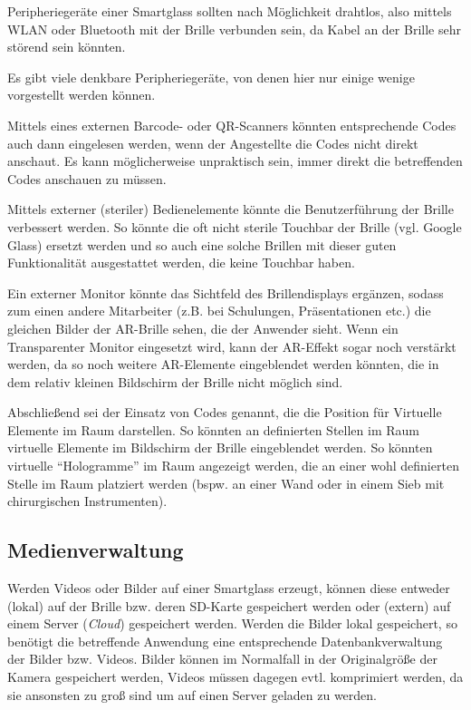 Peripheriegeräte einer Smartglass sollten nach Möglichkeit drahtlos, also mittels WLAN oder Bluetooth mit der Brille verbunden sein, da Kabel an der Brille sehr störend sein könnten. 

Es gibt viele denkbare Peripheriegeräte, von denen hier nur einige wenige vorgestellt werden können.

Mittels eines externen Barcode- oder QR-Scanners könnten entsprechende Codes auch dann eingelesen werden, wenn der Angestellte die Codes nicht direkt anschaut. Es kann möglicherweise unpraktisch sein, immer direkt die betreffenden Codes anschauen zu müssen. 

Mittels externer (steriler) Bedienelemente könnte die Benutzerführung der Brille verbessert werden. So könnte die oft nicht sterile Touchbar der Brille (vgl. Google Glass) ersetzt werden und so auch eine solche Brillen mit dieser guten Funktionalität ausgestattet werden, die keine Touchbar haben. 

Ein externer Monitor könnte das Sichtfeld des Brillendisplays ergänzen, sodass zum einen andere Mitarbeiter (z.B. bei Schulungen, Präsentationen etc.) die gleichen Bilder der AR-Brille sehen, die der Anwender sieht. Wenn ein Transparenter Monitor eingesetzt wird, kann der AR-Effekt sogar noch verstärkt werden, da so noch weitere AR-Elemente eingeblendet werden könnten, die in dem relativ kleinen Bildschirm der Brille nicht möglich sind.

Abschließend sei der Einsatz von Codes genannt, die die Position für Virtuelle Elemente im Raum darstellen. So könnten an definierten Stellen im Raum virtuelle Elemente im Bildschirm der Brille eingeblendet werden. So könnten virtuelle \enquote{Hologramme} im Raum angezeigt werden, die an einer wohl definierten Stelle im Raum platziert werden (bspw. an einer Wand oder in einem Sieb mit chirurgischen Instrumenten).
%
%
%
%
%
%
\subsection{Medienverwaltung}
\label{sec:Medienverwaltung}
Werden Videos oder Bilder auf einer Smartglass erzeugt, können diese entweder (lokal) auf der Brille bzw. deren SD-Karte gespeichert werden oder (extern) auf einem Server (\emph{Cloud}) gespeichert werden. Werden die Bilder lokal gespeichert, so benötigt die betreffende Anwendung eine entsprechende Datenbankverwaltung der Bilder bzw. Videos. Bilder können im Normalfall in der Originalgröße der Kamera gespeichert werden, Videos müssen dagegen evtl. komprimiert werden, da sie ansonsten zu groß sind um auf einen Server geladen zu werden. 

